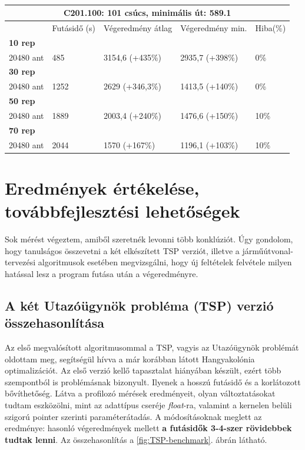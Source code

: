 \begin{table}[ht!]
	\centering
	\begin{tabular}{|p{1.75cm}||p{2cm}|p{3.25cm}|p{3.25cm}|p{1.5cm}|}
		\hline
		\multicolumn{5}{|c|}{C201.100: 101 csúcs, minimális út: 589.1} \\
		\hline
		& Futásidő (s) & Végeredmény átlag & Végeredmény min. & Hiba(\%) \\
		\hline
		\textbf{10 rep} &  &  &  &  \\
		20480 ant & 485 & 3154,6 (+435\%) & 2935,7 (+398\%) & 0\% \\
		\hline
		\textbf{30 rep} &  &  &  &  \\
		20480 ant & 1252 & 2629 (+346,3\%) & 1413,5 (+140\%) & 0\% \\
		\hline
		\textbf{50 rep} &  &  &  &  \\
		20480 ant & 1889 & 2003,4 (+240\%) & 1476,6 (+150\%) & 10\% \\
		\hline
		\textbf{70 rep} &  &  &  &  \\
		20480 ant & 2044 & 1570 (+167\%) & 1196,1 (+103\%) &  10\% \\
		\hline
	\end{tabular}
	\caption{}
	\label{table:VRTPW2_100_2}
\end{table}


\chapter{Eredmények értékelése, továbbfejlesztési lehetőségek} \label{results_section}
Sok mérést végeztem, amiből szeretnék levonni több konklúziót. Úgy gondolom, hogy tanulságos összevetni a két elkészített TSP verziót, illetve a járműútvonal-tervezési algoritmusok esetében megvizsgálni, hogy új feltételek felvétele milyen hatással lesz a program futása után a végeredményre.

\section{A két Utazóügynök probléma (TSP) verzió összehasonlítása}

Az első megvalósított algoritmusommal a TSP, vagyis az Utazóügynök problémát oldottam meg, segítségül hívva a már korábban látott Hangyakolónia optimalizációt. Az első verzió kellő tapasztalat hiányában készült, ezért több szempontból is problémásnak bizonyult. Ilyenek a hosszú futásidő és a korlátozott bővíthetőség. Látva a profilozó mérések eredményeit, olyan változtatásokat tudtam eszközölni, mint az adattípus cseréje \textit{float}-ra, valamint a kernelen belüli szigorú pointer szerinti paraméterátadás. A módosításoknak meglett az eredménye: hasonló végeredmények mellett \textbf{a futásidők 3-4-szer rövidebbek tudtak lenni}. Az összehasonlítás a \ref{fig:TSP-benchmark}. ábrán látható.

